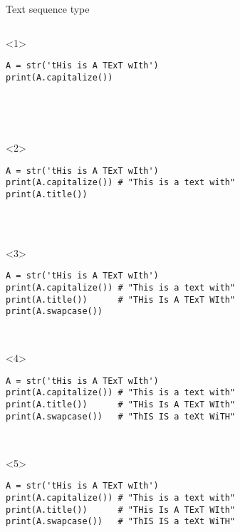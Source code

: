 \begin{frame}[fragile]{Text sequence type}

  \begin{columns}[onlytextwidth]
    \begin{column}{\textwidth}

      \begin{onlyenv}<1>
        \begin{lstlisting}[style=python]
A = str('tHis is A TExT wIth')
print(A.capitalize())





 \end{lstlisting}
      \end{onlyenv}

      \begin{onlyenv}<2>
        \begin{lstlisting}[style=python]
A = str('tHis is A TExT wIth')
print(A.capitalize()) # "This is a text with"
print(A.title())




 \end{lstlisting}
      \end{onlyenv}

      \begin{onlyenv}<3>
        \begin{lstlisting}[style=python]
A = str('tHis is A TExT wIth')
print(A.capitalize()) # "This is a text with"
print(A.title())      # "THis Is A TExT WIth"
print(A.swapcase())



 \end{lstlisting}
      \end{onlyenv}

      \begin{onlyenv}<4>
        \begin{lstlisting}[style=python]
A = str('tHis is A TExT wIth')
print(A.capitalize()) # "This is a text with"
print(A.title())      # "THis Is A TExT WIth"
print(A.swapcase())   # "ThIS IS a teXt WiTH"



 \end{lstlisting}
      \end{onlyenv}

      \begin{onlyenv}<5>
        \begin{lstlisting}[style=python]
A = str('tHis is A TExT wIth')
print(A.capitalize()) # "This is a text with"
print(A.title())      # "THis Is A TExT WIth"
print(A.swapcase())   # "ThIS IS a teXt WiTH"


\end{lstlisting}
\end{onlyenv}
\end{column}
\end{columns}
\end{frame}
